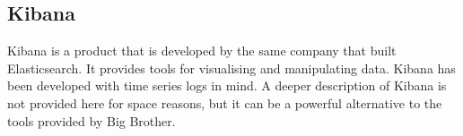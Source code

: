 \vspace{-8pt}
\subsection{Kibana}

Kibana is a product that is developed by the same company that built Elasticsearch. It provides tools for visualising and manipulating data. Kibana has been developed with time series logs in mind. A deeper description of Kibana is not provided here for space reasons, but it can be a powerful alternative to the tools provided by Big Brother.